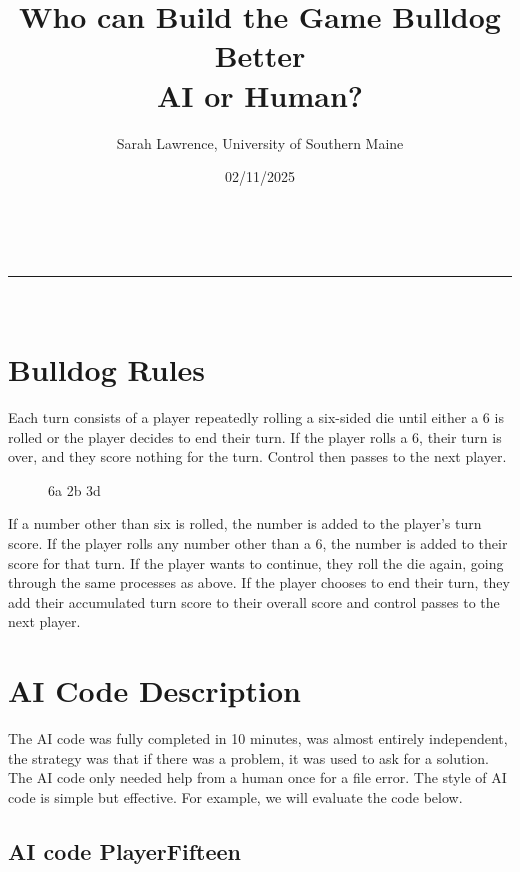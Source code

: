 \documentclass[a4paper,11pt]{article}
\makeatletter
\newcommand{\linia}{\rule{\linewidth}{0.5pt}}
\renewcommand{\maketitle}{
\begin{center}
\vspace{2ex}
{\huge \textsc{\@title}}
\vspace{1ex}
\\
\linia\\
\@author \hfill \@date
\vspace{4ex}
\end{center}
}
\makeatother
\begin{document}
\title{Who can Build the Game Bulldog Better \\AI or Human?}

\author{Sarah Lawrence, University of Southern Maine}

\date{02/11/2025}

\maketitle

\section*{Bulldog Rules}
Each turn consists of a player repeatedly rolling a six-sided die until either a 6 is rolled or the player decides to end their turn. If the player rolls a 6, their turn is over, and they score nothing for the turn. Control then passes to the next player.
\begin{figure}[h]
\centering
\Huge {}
{6a 2b 3d}
\end{figure}
If a number other than six is rolled, the number is added to the player's turn score. If the player rolls any number other than a 6, the number is added to their score for that turn. If the player wants to continue, they roll the die again, going through the same processes as above. If the player chooses to end their turn, they add their accumulated turn score to their overall score and control passes to the next player.

\section*{AI Code Description}
The AI code was fully completed in 10 minutes, was almost entirely independent, the strategy was that if there was a problem, it was used to ask for a solution. The AI code only needed help from a human once for a file error. The style of AI code is simple but effective. For example, we will evaluate the code below.
\subsection*{AI code PlayerFifteen}
\end{document}
